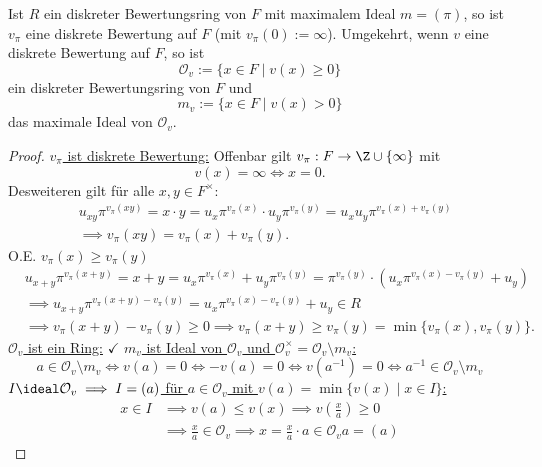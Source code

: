 \begin{satz}\label{I2.18}
    Ist $R$ ein diskreter Bewertungsring von $F$ mit maximalem Ideal $m = (\pi)$, so ist $v_\pi$ eine 
    diskrete Bewertung auf $F$ (mit $v_\pi(0) := \infty$).
    Umgekehrt, wenn $v$ eine diskrete Bewertung auf $F$, so ist
    $$ \mathcal{O}_v := \{x \in F \mid v(x) \geq 0\}$$
    ein diskreter Bewertungsring von $F$ und
    $$ m_v := \{x \in F \mid v(x) > 0\} $$
    das maximale Ideal von $\mathcal{O}_v$.
\end{satz}
\begin{proof}
    \underline{$v_\pi$ ist diskrete Bewertung:} Offenbar gilt $v_\pi : F \to \Z \cup \{\infty\}$ mit $$v(x) = \infty \iff x = 0.$$\nl
    Desweiteren gilt für alle $x,y \in F^\times$:
    \begin{align*}
        &u_{xy} \pi^{v_\pi(xy)} = x\cdot y = u_x \pi^{v_\pi(x)} \cdot u_y \pi^{v_\pi(y)} = u_xu_y \pi^{v_\pi(x) + v_\pi(y)}\\
        & \implies v_\pi(xy) = v_\pi(x) + v_\pi(y).
    \end{align*}
    O.E. $v_\pi(x) \geq v_\pi(y)$
    \begin{align*}
        &u_{x+y} \pi^{v_\pi(x+y)} = x + y = u_x \pi^{v_\pi(x)} + u_y \pi^{v_\pi(y)} = \pi^{v_\pi(y)}\cdot\left(u_x \pi^{v_\pi(x) - v_\pi(y)} + u_y\right)\\ 
        & \implies u_{x+y} \pi^{v_\pi(x+y) - v_\pi(y)} =  u_x \pi^{v_\pi(x) - v_\pi(y)} + u_y \in R\\
        & \implies v_\pi(x+y) - v_\pi(y) \geq 0 \implies v_\pi(x+y) \geq v_\pi(y) = \min \{v_\pi(x), v_\pi(y)\}.
    \end{align*}
    \underline{$\mathcal{O}_v$ ist ein Ring:} $\checkmark$\nl
    \underline{$m_v$ ist Ideal von $\mathcal{O}_v$ und $\mathcal{O}_v^\times = \mathcal{O}_v\setminus m_v$:}
    $$ a \in \mathcal{O}_v \setminus m_v \iff v(a) = 0 \iff -v(a) = 0 \iff v(a^{-1}) = 0 \iff a^{-1} \in \mathcal{O}_v \setminus m_v $$
    \underline{$I \ideal \mathcal{O}_v \implies I=(a)$ für $a \in \mathcal{O}_v$ mit $v(a) = \min\{v(x) \mid x \in I\}$:}
    \begin{align*}
        x \in I & \implies v(a) \leq v(x) \implies v\left(\frac{x}{a}\right) \geq 0\\
        & \implies \frac{x}{a} \in \mathcal{O}_v \implies x = \frac{x}{a}\cdot a \in \mathcal{O}_v a = (a)
    \end{align*}
\end{proof}

